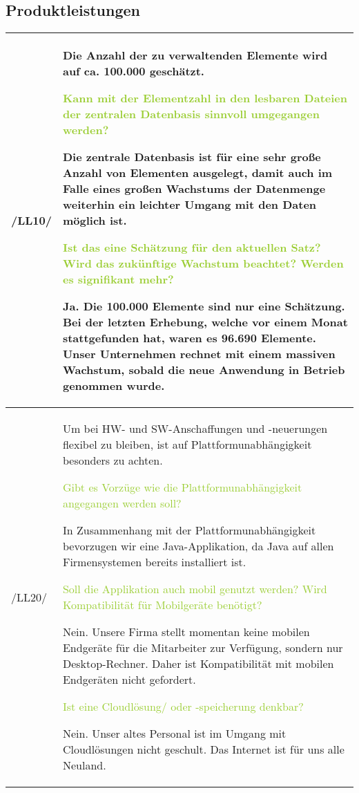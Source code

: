 \subsection{Produktleistungen}

\begin{center}
    \begin{tabular}[ht] {l | p{13cm}}
        \hline
        /LL10/ & Die Anzahl der zu verwaltenden Elemente wird auf ca. 100.000 geschätzt. 
        
        \textcolor{YellowGreen}{Kann mit der Elementzahl in den lesbaren Dateien der zentralen Datenbasis sinnvoll umgegangen werden?}

        \textcolor{NavyBlue}{Die zentrale Datenbasis ist für eine sehr große Anzahl von Elementen ausgelegt, damit auch im Falle eines großen Wachstums der Datenmenge weiterhin ein leichter Umgang mit den Daten möglich ist.}

        \textcolor{YellowGreen}{Ist das eine Schätzung für den \grqq{}aktuellen\grqq{} Satz? Wird das zukünftige Wachstum beachtet? Werden es signifikant mehr?}
        
        \textcolor{NavyBlue}{Ja. Die 100.000 Elemente sind nur eine Schätzung. Bei der letzten Erhebung, welche vor einem Monat stattgefunden hat, waren es 96.690 Elemente. Unser Unternehmen rechnet mit einem massiven Wachstum, sobald die neue Anwendung in Betrieb genommen wurde.}



        \\
        \hline
        /LL20/ & Um bei HW- und SW-Anschaffungen und -neuerungen flexibel zu bleiben, ist auf Plattformunabhängigkeit besonders zu achten. 
        
        \textcolor{YellowGreen}{Gibt es Vorzüge wie die Plattformunabhängigkeit angegangen werden soll?}

        \textcolor{NavyBlue}{In Zusammenhang mit der Plattformunabhängigkeit bevorzugen wir eine Java-Applikation, da Java auf allen Firmensystemen bereits installiert ist.}

        \textcolor{YellowGreen}{Soll die Applikation auch mobil genutzt werden? Wird Kompatibilität für Mobilgeräte benötigt?}

        \textcolor{NavyBlue}{Nein. Unsere Firma stellt momentan keine mobilen Endgeräte für die Mitarbeiter zur Verfügung, sondern nur Desktop-Rechner. Daher ist Kompatibilität mit mobilen Endgeräten nicht gefordert.}

        \textcolor{YellowGreen}{Ist eine Cloudlösung/ oder -speicherung denkbar?}

        \textcolor{NavyBlue}{Nein. Unser altes Personal ist im Umgang mit Cloudlösungen nicht geschult. Das Internet ist für uns alle Neuland.}

        \\
        \hline
    \end{tabular}
\end{center}

